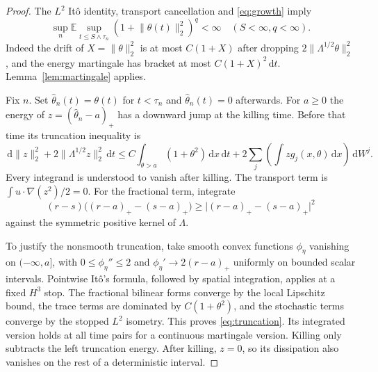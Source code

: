 \documentclass[11pt]{amsart}
\theoremstyle{remark}
\numberwithin{equation}{section}
\newcommand{\EE}{\mathbb E}
\newcommand{\dd}{\,\mathrm d}
\newcommand{\norm}[1]{\lVert#1\rVert}
\begin{document}
\begin{proof}
The $L^2$ It\^o identity, transport cancellation and \eqref{eq:growth} imply
\begin{equation}\label{eq:L2moments}
 \sup_n\EE\sup_{t\leq S\wedge\tau_n}
       (1+\norm{\theta(t)}_2^2)^q<\infty
 \quad(S<\infty, q<\infty).
\end{equation}
Indeed the drift of $X=\norm{\theta}_2^2$ is at most $C(1+X)$ after dropping
$2\norm{\Lambda^{1/2}\theta}_2^2$, and the energy martingale has bracket
at most $C(1+X)^2\dd t$. Lemma~\ref{lem:martingale} applies.

Fix $n$. Set $\widehat\theta_n(t)=\theta(t)$ for $t<\tau_n$ and
$\widehat\theta_n(t)=0$ afterwards. For $a\geq0$ the energy of
$z=(\widehat\theta_n-a)_+$ has a downward jump at the killing time.
Before that time its truncation inequality is
\begin{equation}\label{eq:truncation}
 \dd\norm{z}_2^2+2\norm{\Lambda^{1/2}z}_2^2\dd t
 \leq C\int_{\theta>a}(1+\theta^2)\dd x\dd t
       +2\sum_j\left(\int z g_j(x,\theta)\dd x\right)\dd W^j.
\end{equation}
Every integrand is understood to vanish after killing. The transport term is
$\int u\cdot\nabla(z^2)/2=0$. For the fractional term, integrate
\[
 (r-s)\big((r-a)_+-(s-a)_+\big)
       \geq\big|(r-a)_+-(s-a)_+\big|^2
\]
against the symmetric positive kernel of $\Lambda$.

To justify the nonsmooth truncation, take smooth convex functions $\phi_\eta$
vanishing on $(-\infty,a]$, with $0\leq\phi_\eta''\leq2$ and
$\phi_\eta'\to2(r-a)_+$ uniformly on bounded scalar intervals. Pointwise
It\^o's formula, followed by spatial integration, applies at a fixed $H^3$
stop. The fractional bilinear forms converge by the local Lipschitz bound,
the trace terms are dominated by $C(1+\theta^2)$, and the stochastic terms
converge by the stopped $L^2$ isometry. This proves \eqref{eq:truncation}.
Its integrated version holds at all time pairs for a continuous martingale
version. Killing only subtracts the left truncation energy. After killing,
$z=0$, so its dissipation also vanishes on the rest of a deterministic interval.


\end{proof}
\end{document}
